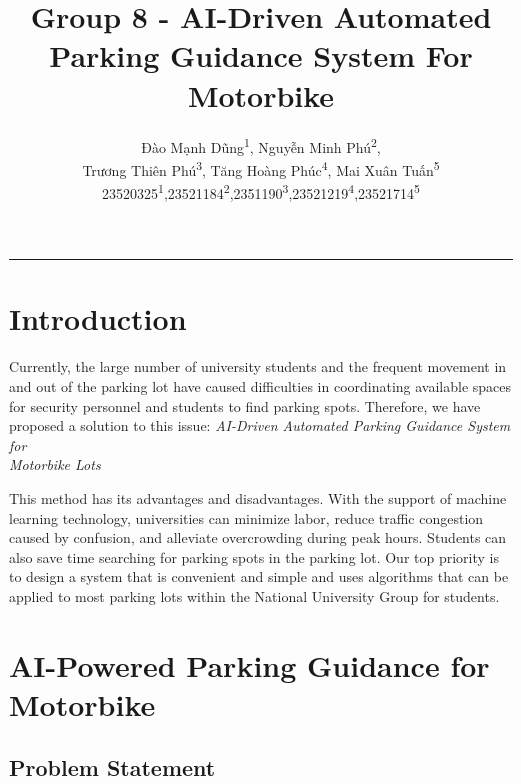 \documentclass{article}
\title{\textbf{Group 8 - AI-Driven Automated Parking Guidance System For\\ Motorbike}}
\author{
    Đào Mạnh Dũng\textsuperscript{1}, Nguyễn Minh Phú\textsuperscript{2},\\ 
    Trương Thiên Phú\textsuperscript{3}, Tăng Hoàng Phúc\textsuperscript{4}, Mai Xuân Tuấn\textsuperscript{5}\\
    23520325\textsuperscript{1},23521184\textsuperscript{2},2351190\textsuperscript{3},23521219\textsuperscript{4},23521714\textsuperscript{5}
}
\date{}
\begin{document}
\maketitle
\rule{\linewidth}{0.6pt}
\thispagestyle{fancy}
\section{Introduction}
Currently, the large number of university students and the frequent movement in and out of the parking lot have caused difficulties in coordinating available spaces for security personnel and students to find parking spots. Therefore, we have proposed a solution to this issue: \textit{AI-Driven Automated Parking Guidance System for\\ Motorbike Lots}

This method has its advantages and disadvantages. With the support of machine learning technology, universities can minimize labor, reduce traffic congestion caused by confusion, and alleviate overcrowding during peak hours. Students can also save time searching for parking spots in the parking lot. Our top priority is to design a system that is convenient and simple and uses algorithms that can be applied to most parking lots within the National University Group for students.

\section{AI-Powered Parking Guidance for Motorbike}
    \subsection{Problem Statement}
\end{document}
